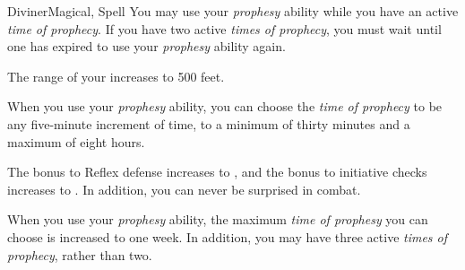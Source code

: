 \begin{feat}{Diviner}{Magical, Spell}
         You may use your \textit{prophesy} ability while you have an active \textit{time of prophecy}.
        If you have two active \textit{times of prophecy}, you must wait until one has expired to use your \textit{prophesy} ability again.

         The range of your  increases to 500 feet.

         When you use your \textit{prophesy} ability, you can choose the \textit{time of prophecy} to be any five-minute increment of time, to a minimum of thirty minutes and a maximum of eight hours.

         The bonus to Reflex defense increases to , and the bonus to initiative checks increases to .
        In addition, you can never be surprised in combat.

         When you use your \textit{prophesy} ability, the maximum \textit{time of prophesy} you can choose is increased to one week.
        In addition, you may have three active \textit{times of prophecy}, rather than two.
    \end{feat}

